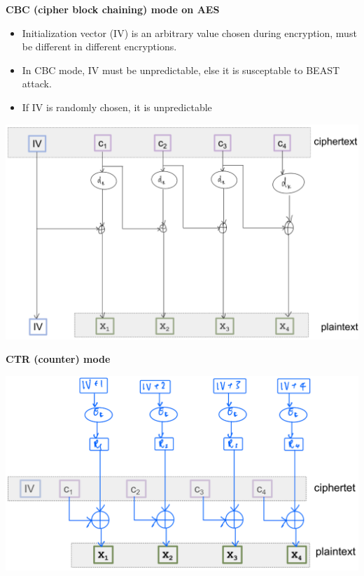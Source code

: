 \documentclass[landscape,a4paper]{extarticle}
\newenvironment{Figure}
  {\par\noindent\minipage{\linewidth}}
  {\endminipage\par\medskip}
\begin{document}
\begin{multicols*}{5}
    \textbf{CBC (cipher block chaining) mode on AES}
    \begin{itemize}
        \item Initialization vector (IV) is an arbitrary value chosen during encryption, 
        must be different in different encryptions. 
        \item In CBC mode, IV must be unpredictable, else it is susceptable to BEAST attack.
        \item If IV is randomly chosen, it is unpredictable
    \end{itemize}
    \begin{Figure}
        \centering
        \includegraphics[width=\linewidth]{cbc_decryption.png}        
    \end{Figure}

    \textbf{CTR (counter) mode}
    \begin{Figure}
        \centering
        \includegraphics[width=\linewidth]{ctr_decryption.png}        
    \end{Figure}


\end{multicols*}
\end{document}
